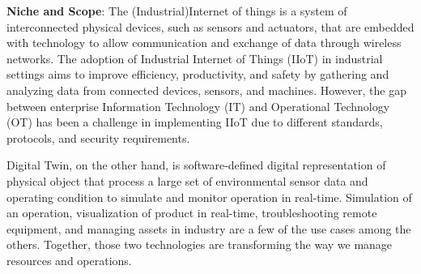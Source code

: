 

\textbf{Niche and Scope}:
% 
The (Industrial)Internet of things is a system of interconnected physical devices, such as sensors and actuators, that are embedded with technology to allow communication and exchange of data through wireless networks\cite{maillet-contozEndtoendSecurityValidation2020}. The adoption of Industrial Internet of Things (IIoT) in industrial settings aims to improve efficiency, productivity, and safety by gathering and analyzing data from connected devices, sensors, and machines\cite{kumarBlockchainDeepLearning2022}. However, the gap between enterprise Information Technology (IT) and Operational Technology (OT) has been a challenge in implementing IIoT due to different standards, protocols, and security requirements\cite{adrienbacueDigitalTwinsEnhanced2022}.

Digital Twin, on the other hand, is software-defined digital representation of physical object that process a large set of environmental sensor data  and operating condition to simulate and monitor operation in real-time\cite{williamdanilczykANGELIntelligentDigital2019, danilczykSmartGridAnomaly2021}. Simulation of an operation, visualization of product in real-time, troubleshooting remote equipment, and managing assets in industry are a few of the use cases among the others. Together, those two technologies are transforming the way we manage resources and operations.


